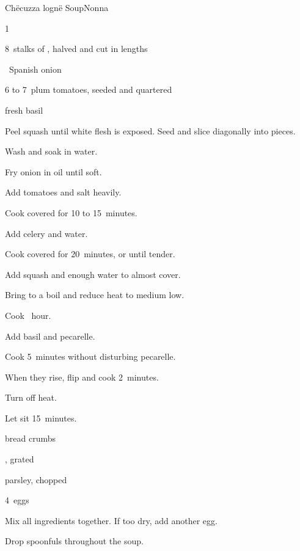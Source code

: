 \begin{recipe}{Chëcuzza lognë Soup}{Nonna}{}

\begin{ingredients}
\item 1~
\item 8~stalks of , halved and cut in  lengths
\item \half~Spanish onion
\item 6 to 7~plum tomatoes, seeded and quartered
\item fresh basil
\end{ingredients}

\begin{directions}
\item Peel squash until white flesh is exposed. Seed and slice diagonally into \inch{\threequarter} pieces.
\item Wash and soak in water.
\item Fry onion in oil until soft.
\item Add tomatoes and salt heavily.
\item Cook covered for 10 to 15~minutes.
\item Add celery and  water.
\item Cook covered for 20~minutes, or until tender.
\item Add squash and enough water to almost cover.
\item Bring to a boil and reduce heat to medium low.
\item Cook \half~hour.
\item Add basil and pecarelle.
\item Cook 5~minutes without disturbing pecarelle.
\item When they rise, flip and cook 2~minutes.
\item Turn off heat.
\item Let sit 15~minutes.
\end{directions}

\begin{ingredients}
\item \C{\threequarter} bread crumbs
\item {} , grated
\item parsley, chopped
\item 4~eggs
\end{ingredients}

\begin{directions}
\item Mix all ingredients together. If too dry, add another egg.
\item Drop spoonfuls throughout the soup.
\end{directions}

\end{recipe}
